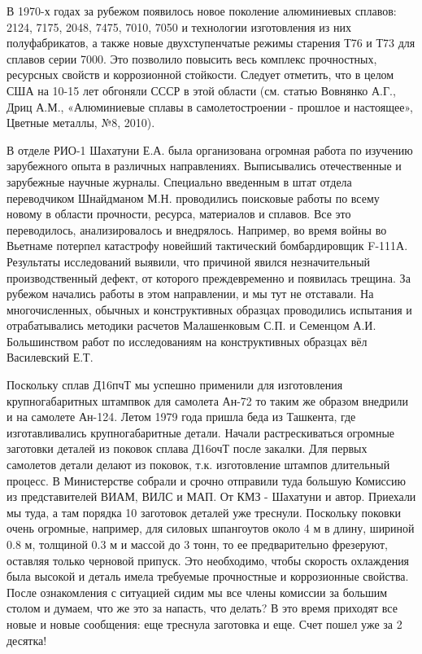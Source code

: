 В 1970-х годах за рубежом появилось новое поколение алюминиевых сплавов: 2124,
7175, 2048, 7475, 7010, 7050 и технологии изготовления из них полуфабрикатов, а
также новые двухступенчатые режимы старения Т76 и Т73 для сплавов серии 7000.
Это позволило повысить весь комплекс прочностных, ресурсных свойств и
коррозионной стойкости. Следует отметить, что в целом США на 10-15 лет обгоняли
СССР в этой области (см. статью Вовнянко А.Г., Дриц А.М., «Алюминиевые сплавы в
самолетостроении - прошлое и настоящее», Цветные металлы, №8, 2010).

В отделе РИО-1 Шахатуни Е.А. была организована огромная работа по изучению
зарубежного опыта в различных направлениях. Выписывались отечественные и
зарубежные научные журналы. Специально введенным в штат отдела переводчиком
Шнайдманом М.Н. проводились поисковые работы по всему новому в области
прочности, ресурса, материалов и сплавов. Все это переводилось, анализировалось
и внедрялось. Например, во время войны во Вьетнаме потерпел катастрофу новейший
тактический бомбардировщик F-111А. Результаты исследований выявили, что
причиной явился незначительный производственный дефект, от которого
преждевременно и появилась трещина. За рубежом начались работы в этом
направлении, и мы тут не отставали. На многочисленных, обычных и конструктивных
образцах проводились испытания и отрабатывались методики расчетов Малашенковым
С.П. и Семенцом А.И. Большинством работ по исследованиям на конструктивных
образцах вёл Василевский Е.Т.

Поскольку сплав Д16пчТ мы успешно применили для изготовления крупногабаритных
штампвок для самолета Ан-72 то таким же образом внедрили и на самолете Ан-124.
Летом 1979 года пришла беда из Ташкента, где изготавливались крупногабаритные
детали. Начали растрескиваться огромные заготовки деталей из поковок сплава
Д16очТ после закалки. Для первых самолетов детали делают из поковок, т.к.
изготовление штампов длительный процесс. В Министерстве собрали и срочно
отправили туда большую Комиссию из представителей ВИАМ, ВИЛС и МАП. От КМЗ -
Шахатуни и автор. Приехали мы туда, а там порядка 10 заготовок деталей уже
треснули. Поскольку поковки очень огромные, например, для силовых шпангоутов
около 4 м в длину, шириной 0.8 м, толщиной 0.3 м и массой до 3 тонн, то ее
предварительно фрезеруют, оставляя только черновой припуск. Это необходимо,
чтобы скорость охлаждения была высокой и деталь имела требуемые прочностные и
коррозионные свойства. После ознакомления с ситуацией сидим мы все члены
комиссии за большим столом и думаем, что же это за напасть, что делать? В это
время приходят все новые и новые сообщения: еще треснула заготовка и еще. Счет
пошел уже за 2 десятка!
